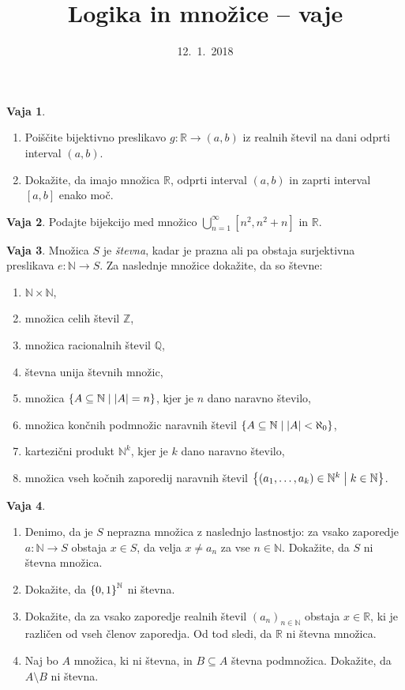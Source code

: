 \documentclass{article}
\newcommand{\NN}{\mathbb{N}}
\newcommand{\ZZ}{\mathbb{Z}}
\newcommand{\QQ}{\mathbb{Q}}
\newcommand{\RR}{\mathbb{R}}
\theoremstyle{definition}
\newtheorem{vaja}{Vaja}
\begin{document}
\title{Logika in množice -- vaje}
\date{12.~1.~2018}
\maketitle

\begin{vaja}
  \
  \begin{enumerate}
    \item
      Poiščite bijektivno preslikavo $g\colon \RR \to (a,b)$ iz realnih števil na dani odprti interval $(a,b)$.
    \item
      Dokažite, da imajo množica $\RR$, odprti interval $(a,b)$ in zaprti interval $[a,b]$ enako moč.
  \end{enumerate}
\end{vaja}

\begin{vaja}
  Podajte bijekcijo med množico $\bigcup_{n = 1}^{\infty} [n^2, n^2 + n]$ in $\mathbb{R}$.
\end{vaja}

\begin{vaja}
  Množica $S$ je \emph{števna}, kadar je prazna ali pa obstaja surjektivna preslikava $e\colon \NN \to S$. Za naslednje množice dokažite, da so števne:
  \begin{enumerate}
    \item
      $\NN \times \NN$,
    \item
      množica celih števil $\ZZ$,
    \item
      množica racionalnih števil $\QQ$,
    \item
      števna unija števnih množic,
    \item
      množica $\set{A \subseteq \NN}{|A| = n}$, kjer je $n$ dano naravno število,
    \item
      množica končnih podmnožic naravnih števil $\set{A \subseteq \NN}{|A| < \aleph_0}$,
    \item
      kartezični produkt $\NN^k$, kjer je $k$ dano naravno število,
    \item
      množica vseh kočnih zaporedij naravnih števil $\set{(a_1, \ldots, a_k) \in \NN^k}{k \in \NN}$.
  \end{enumerate}
\end{vaja}

\begin{vaja}
  \
  \begin{enumerate}
    \item
      Denimo, da je $S$ neprazna množica z naslednjo lastnostjo: za vsako zaporedje $a\colon \NN \to S$ obstaja $x \in S$, da velja $x \neq a_n$ za vse $n \in \NN$. Dokažite, da $S$ ni števna množica.
    \item
      Dokažite, da $\set{0,1}^\NN$ ni števna.
    \item
      Dokažite, da za vsako zaporedje realnih števil $(a_n)_{n \in \NN}$ obstaja $x \in \RR$, ki je različen od vseh členov zaporedja. Od tod sledi, da $\RR$ ni števna množica.
    \item
      Naj bo $A$ množica, ki ni števna, in $B \subseteq A$ števna podmnožica. Dokažite, da $A \setminus B$ ni števna.
  \end{enumerate}
\end{vaja}
\end{document}
